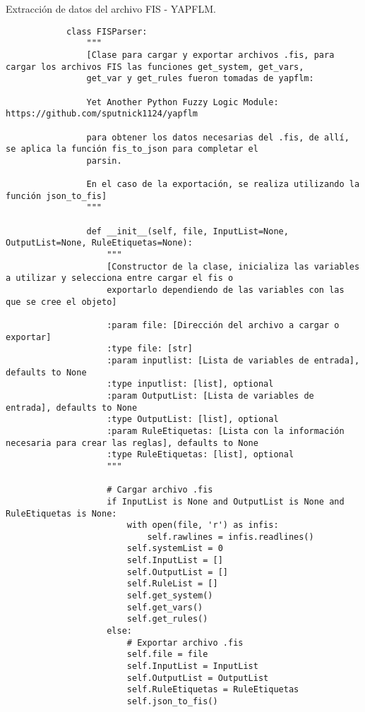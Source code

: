     \begin{longlisting}
        \caption[Extracción de datos del archivo FIS - YAPFLM]{Extracción de datos del archivo FIS - YAPFLM.}
        \label{code:anexoF1}				
        \begin{verbatim}
            class FISParser:
                """
                [Clase para cargar y exportar archivos .fis, para cargar los archivos FIS las funciones get_system, get_vars,
                get_var y get_rules fueron tomadas de yapflm: 
                
                Yet Another Python Fuzzy Logic Module: https://github.com/sputnick1124/yapflm 
                
                para obtener los datos necesarias del .fis, de allí, se aplica la función fis_to_json para completar el 
                parsin.
                
                En el caso de la exportación, se realiza utilizando la función json_to_fis]
                """

                def __init__(self, file, InputList=None, OutputList=None, RuleEtiquetas=None):
                    """
                    [Constructor de la clase, inicializa las variables a utilizar y selecciona entre cargar el fis o
                    exportarlo dependiendo de las variables con las que se cree el objeto]
                    
                    :param file: [Dirección del archivo a cargar o exportar]
                    :type file: [str]
                    :param inputlist: [Lista de variables de entrada], defaults to None
                    :type inputlist: [list], optional
                    :param OutputList: [Lista de variables de entrada], defaults to None
                    :type OutputList: [list], optional
                    :param RuleEtiquetas: [Lista con la información necesaria para crear las reglas], defaults to None
                    :type RuleEtiquetas: [list], optional
                    """

                    # Cargar archivo .fis
                    if InputList is None and OutputList is None and RuleEtiquetas is None:
                        with open(file, 'r') as infis:
                            self.rawlines = infis.readlines()
                        self.systemList = 0
                        self.InputList = []
                        self.OutputList = []
                        self.RuleList = []
                        self.get_system()
                        self.get_vars()
                        self.get_rules()
                    else:
                        # Exportar archivo .fis
                        self.file = file
                        self.InputList = InputList
                        self.OutputList = OutputList
                        self.RuleEtiquetas = RuleEtiquetas
                        self.json_to_fis()


\end{verbatim}
\end{longlisting}
